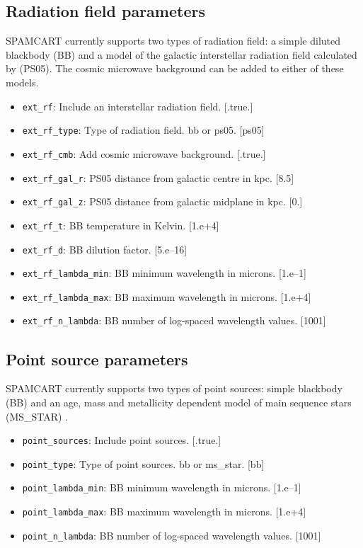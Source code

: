 \documentclass[11pt]{article}
\begin{document}
\subsection{Radiation field parameters}

SPAMCART currently supports two types of radiation field: a simple diluted blackbody (BB) and a model of the galactic interstellar radiation field calculated by \citet{PS05} (PS05). The cosmic microwave background can be added to either of these models.

\begin{itemize}

	\item \texttt{ext\_rf}: Include an interstellar radiation field. [.true.]
	\item \texttt{ext\_rf\_type}: Type of radiation field. bb or ps05. [ps05]
	\item \texttt{ext\_rf\_cmb}: Add cosmic microwave background. [.true.]
	\item \texttt{ext\_rf\_gal\_r}: PS05 distance from galactic centre in kpc. [8.5]
	\item \texttt{ext\_rf\_gal\_z}: PS05 distance from galactic midplane in kpc. [0.]
	\item \texttt{ext\_rf\_t}: BB temperature in Kelvin. [1.e+4]
	\item \texttt{ext\_rf\_d}: BB dilution factor. [5.e--16]
	\item \texttt{ext\_rf\_lambda\_min}: BB minimum wavelength in microns. [1.e--1]
	\item \texttt{ext\_rf\_lambda\_max}: BB maximum wavelength in microns. [1.e+4]
	\item \texttt{ext\_rf\_n\_lambda}: BB number of log-spaced wavelength values. [1001]

\end{itemize}

\subsection{Point source parameters}

SPAMCART currently supports two types of point sources: simple blackbody (BB) and an age, mass and metallicity dependent model of main sequence stars (MS\_STAR) \citep[see][]{CGK97,BMG12}.

\begin{itemize}

	\item \texttt{point\_sources}: Include point sources. [.true.]
	\item \texttt{point\_type}: Type of point sources. bb or ms\_star. [bb]
	\item \texttt{point\_lambda\_min}: BB minimum wavelength in microns. [1.e--1]
	\item \texttt{point\_lambda\_max}: BB maximum wavelength in microns. [1.e+4]
	\item \texttt{point\_n\_lambda}: BB number of log-spaced wavelength values. [1001]
	
\end{itemize}
\end{document}
